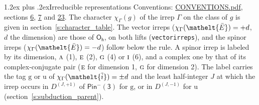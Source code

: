\documentclass[10pt,a4paper]{article}
\makeatletter
\renewcommand\section{\@startsection{section}{1}{\z@}{-3ex plus -1ex minus -.2ex}%
  {1.2ex plus .2ex}{\normalfont\large\sffamily\bfseries\color{parttitle}}}
\numberwithin{equation}{section}
\newcommand{\eltfont}[1]{{\let\sigma\eltsigma\mathelt{#1}}}
\newcommand{\grp}[1]{\mathsf{#1}}
\newcommand{\irr}[1]{\text{\normalfont\scshape #1}}
\newcommand{\elt}[1]{\eltfont{#1}}
\newcommand{\ptag}[1]{\mathrm{#1}}
\newcommand{\irrJp}[2]{D^{(#1,#2)}}
\newcommand{\irchar}[1]{\chi_{#1}}
\newcommand{\barred}[1]{\bar{#1}}
\newcommand{\lift}[1]{\tilde{#1}}
\makeatother
\begin{document}
\section{Irreducible representations}\label{s:irreps}
Conventions: \href{../../CONVENTIONS.pdf}{CONVENTIONS.pdf}, sections \href{../../../rotation/CONVENTIONS.pdf\#conv.6}{6}, \href{../../../rotation/CONVENTIONS.pdf\#conv.7}{7} and \href{../../CONVENTIONS.pdf\#conv.23}{23}.
\leavevmode\label{n:function.character}\label{n:irrep.Gamma}The character $\irchar{\Gamma}(g)$ of the irrep $\Gamma$ on the class of $g$ is given in section~\ref{s:character_table}. \label{n:index.dimension}The vector irreps ($\irchar{\Gamma}(\elt{\barred{E}}) = +d$, $d$ the dimension) are those of \href{../../../rotation/data/pdf/Oh.pdf}{$\grp{O_{h}}$}, on both lifts (\texttt{vectorirreps}), and the spinor irreps ($\irchar{\Gamma}(\elt{\barred{E}}) = -d$) follow below the rule. A spinor irrep is labeled by its dimension, $\irr{a}$ (1), $\irr{e}$ (2), $\irr{g}$ (4) or $\irr{i}$ (6), and a complex one by that of its complex-conjugate pair ($\irr{e}$ for dimension 1, $\irr{g}$ for dimension 2). The label carries the tag $\ptag{g}$ or $\ptag{u}$ of $\irchar{\Gamma}(\elt{\lift{i}}) = \pm d$ and the least half-integer $J$ at which the irrep occurs in $\irrJp{J}{+1}$ of $\grp{Pin^{-}(3)}$ for $\ptag{g}$, or in $\irrJp{J}{-1}$ for $\ptag{u}$ (section~\ref{s:subduction_parent}).
\end{document}
